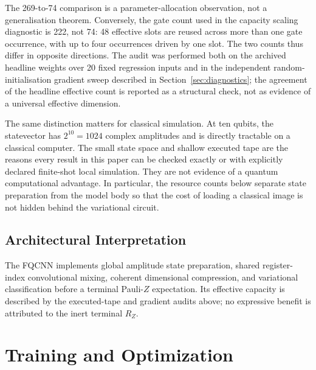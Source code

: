 \documentclass[conference]{IEEEtran}
\begin{document}
The 269-to-74 comparison is a parameter-allocation observation, not a
generalisation theorem. Conversely, the gate count used in the capacity
scaling diagnostic is 222, not 74: 48 effective slots are reused across more
than one gate occurrence, with up to four occurrences driven by one slot. The
two counts thus differ in opposite directions. The audit was performed both on
the archived headline weights over 20 fixed regression inputs and in the
independent random-initialisation gradient sweep described in
Section~\ref{sec:diagnostics}; the agreement of the headline effective count is
reported as a structural check, not as evidence of a universal effective
dimension.

The same distinction matters for classical simulation. At ten qubits, the
statevector has $2^{10}=1024$ complex amplitudes and is directly tractable on a
classical computer. The small state space and shallow executed tape are the
reasons every result in this paper can be checked exactly or with explicitly
declared finite-shot local simulation. They are not evidence of a quantum
computational advantage. In particular, the resource counts below separate
state preparation from the model body so that the cost of loading a classical
image is not hidden behind the variational circuit.

\subsection{Architectural Interpretation}
The FQCNN implements global amplitude state preparation, shared register-index convolutional mixing, coherent dimensional compression, and variational classification before a terminal Pauli-$Z$ expectation. Its effective capacity is described by the executed-tape and gradient audits above; no expressive benefit is attributed to the inert terminal $R_Z$.

\section{Training and Optimization}
\end{document}
